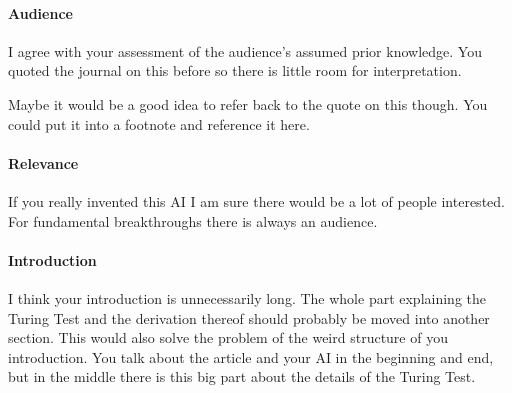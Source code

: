 \documentclass[12pt, a4paper]{article}
\begin{document}
\paragraph{Audience}
I agree with your assessment of the audience's assumed prior knowledge. You quoted the journal on this before so there is little room for interpretation.

Maybe it would be a good idea to refer back to the quote on this though. You could put it into a footnote and reference it here.

\paragraph{Relevance}
If you really invented this AI I am sure there would be a lot of people interested. For fundamental breakthroughs there is always an audience.

\paragraph{Introduction}
I think your introduction is unnecessarily long. The whole part explaining the Turing Test and the derivation thereof should probably be moved into another section.
This would also solve the problem of the weird structure of you introduction. You talk about the article and your AI in the beginning and end, but in the middle there is this big part about the details of the Turing Test.
\end{document}
